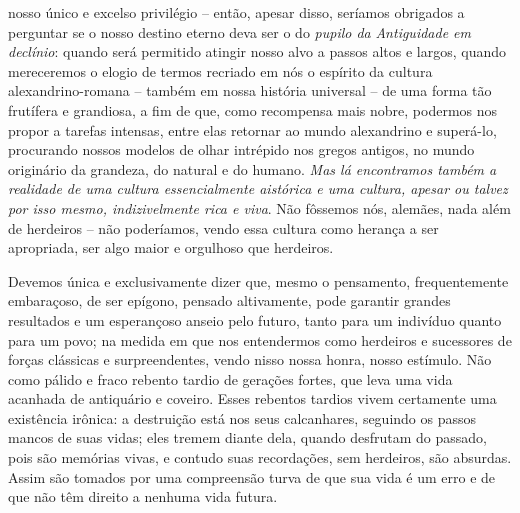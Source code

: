 nosso único e excelso privilégio -- então, apesar disso, seríamos
obrigados a perguntar se o nosso destino eterno deva ser o do
\emph{pupilo da} \emph{Antiguidade em declínio}: quando será permitido
atingir nosso alvo a passos altos e largos, quando mereceremos o elogio
de termos recriado em nós o espírito da cultura alexandrino-romana --
também em nossa história universal -- de uma forma tão frutífera e
grandiosa, a fim de que, como recompensa mais nobre, podermos nos propor
a tarefas intensas, entre elas retornar ao mundo alexandrino e
superá-lo, procurando nossos modelos de olhar intrépido nos gregos
antigos, no mundo originário da grandeza, do natural e do humano.
\emph{Mas lá encontramos também a realidade de uma cultura
essencialmente aistórica e uma cultura, apesar ou talvez por isso mesmo,
indizivelmente rica e viva}. Não fôssemos nós, alemães, nada além de
herdeiros -- não poderíamos, vendo essa cultura como herança a ser
apropriada, ser algo maior e orgulhoso que herdeiros.

Devemos única e exclusivamente dizer que, mesmo o pensamento,
frequentemente embaraçoso, de ser epígono, pensado altivamente, pode
garantir grandes resultados e um esperançoso anseio pelo futuro, tanto
para um indivíduo quanto para um povo; na medida em que nos entendermos
como herdeiros e sucessores de forças clássicas e surpreendentes, vendo
nisso nossa honra, nosso estímulo. Não como pálido e fraco rebento
tardio de gerações fortes, que leva uma vida acanhada de antiquário e
coveiro. Esses rebentos tardios vivem certamente uma existência irônica:
a destruição está nos seus calcanhares, seguindo os passos mancos de
suas vidas; eles tremem diante dela, quando desfrutam do passado, pois
são memórias vivas, e contudo suas recordações, sem herdeiros, são
absurdas. Assim são tomados por uma compreensão turva de que sua vida é
um erro e de que não têm direito a nenhuma vida futura.

